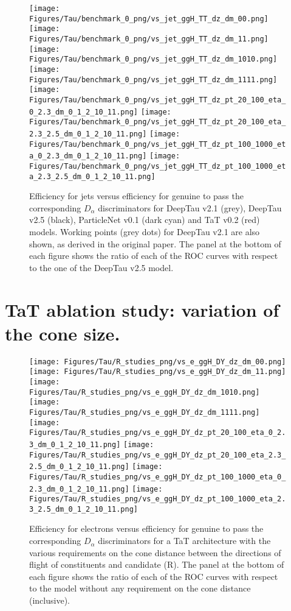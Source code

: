 \begin{figure}[H]
    \centering
    \texttt{[image: Figures/Tau/benchmark\_0\_png/vs\_jet\_ggH\_TT\_dz\_dm\_00.png]}
    \texttt{[image: Figures/Tau/benchmark\_0\_png/vs\_jet\_ggH\_TT\_dz\_dm\_11.png]}
    \texttt{[image: Figures/Tau/benchmark\_0\_png/vs\_jet\_ggH\_TT\_dz\_dm\_1010.png]}
    \texttt{[image: Figures/Tau/benchmark\_0\_png/vs\_jet\_ggH\_TT\_dz\_dm\_1111.png]}
    \texttt{[image: Figures/Tau/benchmark\_0\_png/vs\_jet\_ggH\_TT\_dz\_pt\_20\_100\_eta\_0\_2.3\_dm\_0\_1\_2\_10\_11.png]}
    \texttt{[image: Figures/Tau/benchmark\_0\_png/vs\_jet\_ggH\_TT\_dz\_pt\_20\_100\_eta\_2.3\_2.5\_dm\_0\_1\_2\_10\_11.png]}
    \texttt{[image: Figures/Tau/benchmark\_0\_png/vs\_jet\_ggH\_TT\_dz\_pt\_100\_1000\_eta\_0\_2.3\_dm\_0\_1\_2\_10\_11.png]}
    \texttt{[image: Figures/Tau/benchmark\_0\_png/vs\_jet\_ggH\_TT\_dz\_pt\_100\_1000\_eta\_2.3\_2.5\_dm\_0\_1\_2\_10\_11.png]}
    \caption{Efficiency for jets versus efficiency for genuine \tauh to pass the corresponding $D_\alpha$ discriminators for DeepTau v2.1 (grey), DeepTau v2.5 (black), ParticleNet v0.1 (dark cyan) and TaT v0.2 (red) models. Working points (grey dots) for DeepTau v2.1 are also shown, as derived in the original paper. The panel at the bottom of each figure shows the ratio of each of the ROC curves with respect to the one of the DeepTau v2.5 model.}
\end{figure}

\newpage
\section{TaT ablation study: variation of the cone size.}\label{app:tat-cone}

\begin{figure}[H]
    \centering
    \texttt{[image: Figures/Tau/R\_studies\_png/vs\_e\_ggH\_DY\_dz\_dm\_00.png]}
    \texttt{[image: Figures/Tau/R\_studies\_png/vs\_e\_ggH\_DY\_dz\_dm\_11.png]}
    \texttt{[image: Figures/Tau/R\_studies\_png/vs\_e\_ggH\_DY\_dz\_dm\_1010.png]}
    \texttt{[image: Figures/Tau/R\_studies\_png/vs\_e\_ggH\_DY\_dz\_dm\_1111.png]}
    \texttt{[image: Figures/Tau/R\_studies\_png/vs\_e\_ggH\_DY\_dz\_pt\_20\_100\_eta\_0\_2.3\_dm\_0\_1\_2\_10\_11.png]}
    \texttt{[image: Figures/Tau/R\_studies\_png/vs\_e\_ggH\_DY\_dz\_pt\_20\_100\_eta\_2.3\_2.5\_dm\_0\_1\_2\_10\_11.png]}
    \texttt{[image: Figures/Tau/R\_studies\_png/vs\_e\_ggH\_DY\_dz\_pt\_100\_1000\_eta\_0\_2.3\_dm\_0\_1\_2\_10\_11.png]}
    \texttt{[image: Figures/Tau/R\_studies\_png/vs\_e\_ggH\_DY\_dz\_pt\_100\_1000\_eta\_2.3\_2.5\_dm\_0\_1\_2\_10\_11.png]}
    \caption{Efficiency for electrons versus efficiency for genuine \tauh to pass the corresponding $D_\alpha$ discriminators for a TaT architecture with the various requirements on the cone distance between the directions of flight of constituents and \tauh candidate (R). The panel at the bottom of each figure shows the ratio of each of the ROC curves with respect to the model without any requirement on the cone distance (inclusive).}
\end{figure}


